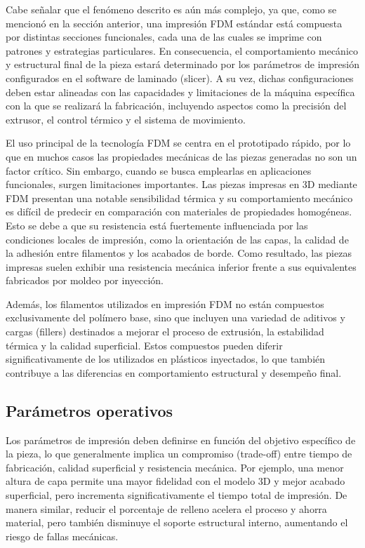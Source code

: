 Cabe señalar que el fenómeno descrito es aún más complejo, ya que, como se mencionó en la sección anterior, una impresión FDM estándar está compuesta por distintas secciones funcionales, cada una de las cuales se imprime con patrones y estrategias particulares. En consecuencia, el comportamiento mecánico y estructural final de la pieza estará determinado por los parámetros de impresión configurados en el software de laminado (slicer). A su vez, dichas configuraciones deben estar alineadas con las capacidades y limitaciones de la máquina específica con la que se realizará la fabricación, incluyendo aspectos como la precisión del extrusor, el control térmico y el sistema de movimiento.

El uso principal de la tecnología FDM se centra en el prototipado rápido, por lo que en muchos casos las propiedades mecánicas de las piezas generadas no son un factor crítico. Sin embargo, cuando se busca emplearlas en aplicaciones funcionales, surgen limitaciones importantes. Las piezas impresas en 3D mediante FDM presentan una notable sensibilidad térmica y su comportamiento mecánico es difícil de predecir en comparación con materiales de propiedades homogéneas. Esto se debe a que su resistencia está fuertemente influenciada por las condiciones locales de impresión, como la orientación de las capas, la calidad de la adhesión entre filamentos y los acabados de borde. Como resultado, las piezas impresas suelen exhibir una resistencia mecánica inferior frente a sus equivalentes fabricados por moldeo por inyección.

Además, los filamentos utilizados en impresión FDM no están compuestos exclusivamente del polímero base, sino que incluyen una variedad de aditivos y cargas (fillers) destinados a mejorar el proceso de extrusión, la estabilidad térmica y la calidad superficial. Estos compuestos pueden diferir significativamente de los utilizados en plásticos inyectados, lo que también contribuye a las diferencias en comportamiento estructural y desempeño final.

\subsection{Parámetros operativos}

Los parámetros de impresión deben definirse en función del objetivo específico de la pieza, lo que generalmente implica un compromiso (trade-off) entre tiempo de fabricación, calidad superficial y resistencia mecánica. Por ejemplo, una menor altura de capa permite una mayor fidelidad con el modelo 3D y mejor acabado superficial, pero incrementa significativamente el tiempo total de impresión. De manera similar, reducir el porcentaje de relleno acelera el proceso y ahorra material, pero también disminuye el soporte estructural interno, aumentando el riesgo de fallas mecánicas.

